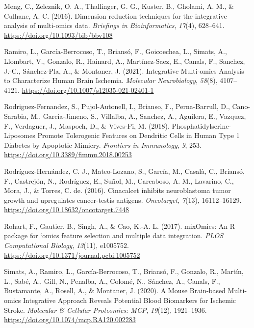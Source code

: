 \documentclass[a4paper, nobind]{templates/ociamthesis}
\newlength{\cslhangindent}
\newenvironment{CSLReferences}[2] %
 {%
  \setlength{\parindent}{0pt}
  \ifodd #1
  \let\oldpar\par
  \def\par{\hangindent=\cslhangindent\oldpar}
  \fi
  \setlength{\parskip}{1mm}
  \setlength{\baselineskip}{6mm}
 }%
 {}
\begin{document}
\begin{CSLReferences}{1}{0}
\leavevmode{}%
Meng, C., Zeleznik, O. A., Thallinger, G. G., Kuster, B., Gholami, A. M., \& Culhane, A. C. (2016). Dimension reduction techniques for the integrative analysis of multi-omics data. \emph{Briefings in Bioinformatics}, \emph{17}(4), 628--641. \url{https://doi.org/10.1093/bib/bbv108}

\leavevmode{}%
Ramiro, L., García-Berrocoso, T., Briansó, F., Goicoechea, L., Simats, A., Llombart, V., Gonzalo, R., Hainard, A., Martínez-Saez, E., Canals, F., Sanchez, J.-C., Sánchez-Pla, A., \& Montaner, J. (2021). Integrative {Multi}-omics {Analysis} to {Characterize} {Human} {Brain} {Ischemia}. \emph{Molecular Neurobiology}, \emph{58}(8), 4107--4121. \url{https://doi.org/10.1007/s12035-021-02401-1}

\leavevmode{}%
Rodriguez-Fernandez, S., Pujol-Autonell, I., Brianso, F., Perna-Barrull, D., Cano-Sarabia, M., Garcia-Jimeno, S., Villalba, A., Sanchez, A., Aguilera, E., Vazquez, F., Verdaguer, J., Maspoch, D., \& Vives-Pi, M. (2018). Phosphatidylserine-{Liposomes} {Promote} {Tolerogenic} {Features} on {Dendritic} {Cells} in {Human} {Type} 1 {Diabetes} by {Apoptotic} {Mimicry}. \emph{Frontiers in Immunology}, \emph{9}, 253. \url{https://doi.org/10.3389/fimmu.2018.00253}

\leavevmode{}%
Rodríguez-Hernández, C. J., Mateo-Lozano, S., García, M., Casalà, C., Briansó, F., Castrejón, N., Rodríguez, E., Suñol, M., Carcaboso, A. M., Lavarino, C., Mora, J., \& Torres, C. de. (2016). Cinacalcet inhibits neuroblastoma tumor growth and upregulates cancer-testis antigens. \emph{Oncotarget}, \emph{7}(13), 16112--16129. \url{https://doi.org/10.18632/oncotarget.7448}

\leavevmode{}%
Rohart, F., Gautier, B., Singh, A., \& Cao, K.-A. L. (2017). {mixOmics}: {An} {R} package for `omics feature selection and multiple data integration. \emph{PLOS Computational Biology}, \emph{13}(11), e1005752. \url{https://doi.org/10.1371/journal.pcbi.1005752}

\leavevmode{}%
Simats, A., Ramiro, L., García-Berrocoso, T., Briansó, F., Gonzalo, R., Martín, L., Sabé, A., Gill, N., Penalba, A., Colomé, N., Sánchez, A., Canals, F., Bustamante, A., Rosell, A., \& Montaner, J. (2020). A {Mouse} {Brain}-based {Multi}-omics {Integrative} {Approach} {Reveals} {Potential} {Blood} {Biomarkers} for {Ischemic} {Stroke}. \emph{Molecular \& Cellular Proteomics: MCP}, \emph{19}(12), 1921--1936. \url{https://doi.org/10.1074/mcp.RA120.002283}


\end{CSLReferences}
\end{document}
